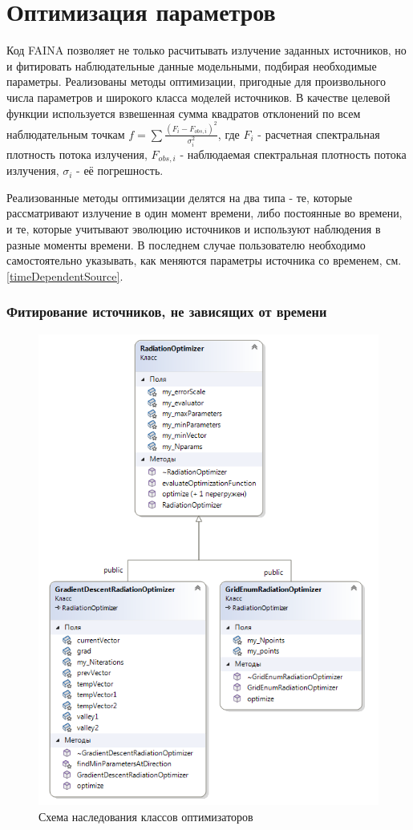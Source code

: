 \chapter{Оптимизация параметров}\label{optimization}
Код FAINA позволяет не только расчитывать излучение заданных источников, но и фитировать наблюдательные данные модельными, подбирая необходимые параметры. Реализованы методы оптимизации, пригодные для произвольного числа параметров и широкого класса моделей источников. В качестве целевой функции используется взвешенная сумма квадратов отклонений по всем наблюдательным точкам $f = \sum \frac{(F_i - F_{obs,i})^2}{\sigma_i^2}$, где $F_i$ - расчетная спектральная плотность потока излучения, $F_{obs,i}$ - наблюдаемая спектральная плотность потока излучения, $\sigma_i$ - её погрешность. 

Реализованные методы оптимизации делятся на два типа - те, которые рассматривают излучение в один момент времени, либо постоянные во времени, и те, которые учитывают эволюцию источников и используют наблюдения в разные моменты времени. В последнем случае пользователю необходимо самостоятельно указывать, как меняются параметры источника со временем, см. \ref{timeDependentSource}.

\subsection{Фитирование источников, не зависящих от времени}
\begin{figure}
	\centering
	\includegraphics[width=10.5 cm]{./fig/radiationOptimizer.png} 
	\caption{Схема наследования классов оптимизаторов}
	\label{radiationOptimizer}
\end{figure}
